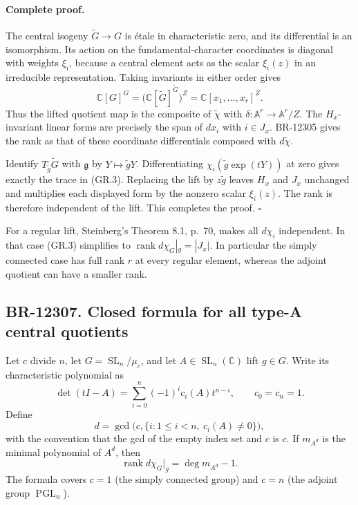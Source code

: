 \documentclass[11pt,a4paper]{article}
\theoremstyle{definition}\newtheorem{definition}[theorem]{Definition}
\theoremstyle{remark}\newtheorem{remark}[theorem]{Remark}
\begin{document}
\paragraph{Complete proof.}
The central isogeny $\widetilde G\to G$ is \'etale in characteristic
zero, and its differential is an isomorphism.  Its action on the
fundamental-character coordinates is diagonal with weights $\xi_i$,
because a central element acts as the scalar $\xi_i(z)$ in an
irreducible representation.  Taking invariants in either order gives
\[
 \mathbb C[G]^G
 =\bigl(\mathbb C[\widetilde G]^{\widetilde G}\bigr)^Z
 =\mathbb C[x_1,\ldots,x_r]^Z.
\]
Thus the lifted quotient map is the composite of
$\widetilde\chi$ with $\delta:\mathbb A^r\to\mathbb A^r/Z$.
The $H_x$-invariant linear forms are precisely the span of $dx_i$
with $i\in J_x$.  BR-12305 gives the rank as that of these
coordinate differentials composed with $d\widetilde\chi$.

Identify $T_{\widetilde g}\widetilde G$ with $\mathfrak g$ by
$Y\mapsto\widetilde gY$.  Differentiating
$\chi_i(\widetilde g\exp(tY))$ at zero gives exactly the trace
in (GR.3).  Replacing the lift by $z\widetilde g$ leaves $H_x$
and $J_x$ unchanged and multiplies each displayed form by the
nonzero scalar $\xi_i(z)$.  The rank is therefore independent
of the lift.  This completes the proof. \(\square\)

For a regular lift, Steinberg's Theorem 8.1, p.~70, makes all
$d\chi_i$ independent.  In that case (GR.3) simplifies to
$\operatorname{rank}d\chi_G|_g=|J_x|$.  In particular the
simply connected case has full rank $r$ at every regular element,
whereas the adjoint quotient can have a smaller rank.

\subsection{BR-12307. Closed formula for all type-A central quotients}
Let $c$ divide $n$, let $G=\operatorname{SL}_n/\mu_c$, and let
$A\in\operatorname{SL}_n(\mathbb C)$ lift $g\in G$.
Write its characteristic polynomial as
\[
 \det(tI-A)=\sum_{i=0}^{n}(-1)^i c_i(A)t^{n-i},
 \qquad c_0=c_n=1.
\]
Define
\[
 d=\gcd\bigl(c,\{i:1\leq i<n,\ c_i(A)\ne0\}\bigr),
 \tag{GR.4}
\]
with the convention that the gcd of the empty index set and $c$
is $c$.  If $m_{A^d}$ is the minimal polynomial of $A^d$, then
\[
 \boxed{\operatorname{rank}d\chi_G|_g
        =\deg m_{A^d}-1.}
 \tag{GR.5}
\]
The formula covers $c=1$ (the simply connected group) and $c=n$
(the adjoint group $\operatorname{PGL}_n$).
\end{document}
